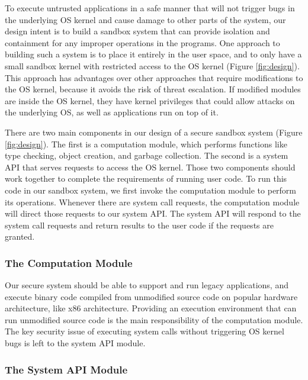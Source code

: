 To execute untrusted applications in a safe manner that will not trigger bugs 
in the underlying OS kernel and cause damage to other parts of the system, 
our design intent is to build a sandbox system that can provide isolation and 
containment for any improper operations in the programs. 
One approach to building such a system is to place it entirely in the user space, 
and to only have a small sandbox kernel with restricted access to the OS kernel (Figure \ref{fig:design}). 
This approach has advantages over other approaches that require modifications to 
the OS kernel, because it avoids the risk of threat escalation. If modified modules 
are inside the OS kernel, they have kernel privileges that could allow attacks on the underlying OS, 
as well as applications run on top of it. 

There are two main components in our design of a secure sandbox system (Figure \ref{fig:design}). 
The first is a computation module, which performs functions like type checking, object creation, 
and garbage collection. The second is a system API that serves requests to access the OS kernel. 
Those two components should work together to complete the requirements of running user code. 
To run this code in our sandbox system, we first invoke the computation module to perform its operations. 
Whenever there are system call requests, 
the computation module will direct those requests to our system API. 
The system API will respond to the system call requests and return results to the user code if the requests are granted. 

\subsubsection{The Computation Module}

Our secure system should be able to support and run legacy applications, 
and execute binary code compiled from unmodified source code on popular hardware architecture, 
like x86 architecture. Providing an execution environment that can run unmodified source code is 
the main responsibility of the computation module. The key security issue of executing system calls 
without triggering OS kernel bugs is left to the system API module.

\subsubsection{The System API Module}

